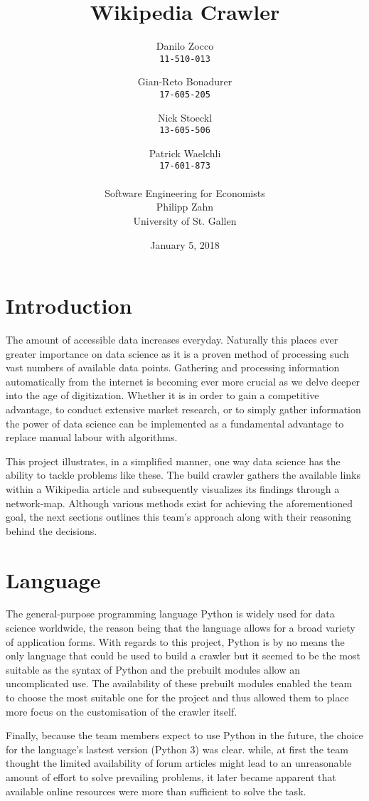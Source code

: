 \documentclass[10pt]{article}
\title{Wikipedia Crawler}
\author{Danilo Zocco\\ \texttt{11-510-013}
	\and Gian-Reto Bonadurer\\ \texttt{17-605-205}
	\and Nick Stoeckl\\ \texttt{13-605-506}
	\and Patrick Waelchli\\ \texttt{17-601-873}\\ \\
	\large Software Engineering for Economists\\
	\large Philipp Zahn\\
	\large University of St. Gallen}
\date{January 5, 2018}
\begin{document}
\maketitle
\newpage

\tableofcontents
\newpage


\section{Introduction}

The amount of accessible data increases everyday. Naturally this places ever greater importance on data science as it is a proven method of processing such vast numbers of available data points. \cite{dat} Gathering and processing information automatically from 
the internet is becoming ever more crucial as we delve deeper into the age of digitization. Whether it is in order to gain a competitive advantage, to conduct extensive market research, or to simply gather information the power of data science can be implemented as a fundamental advantage to replace manual labour with algorithms. \par \noindent
This project illustrates, in a simplified manner, one way data science has the ability to tackle problems like these. The build crawler gathers the available links within a Wikipedia article and subsequently visualizes its findings through a network-map. Although various methods exist for achieving the aforementioned goal, the next sections outlines this team's approach along with their reasoning behind the decisions.

\section{Language}

The general-purpose programming language Python is widely used for data science worldwide, the reason being that the language allows for a broad variety of application forms. \cite{pyt} With regards to this project, Python is by no means the only language that could be used to build a crawler but it seemed to be the most suitable as the syntax of Python and the prebuilt modules allow an uncomplicated use. The availability of these prebuilt modules enabled the team to choose the most suitable one for the project and thus allowed them to place more focus on the customisation of the crawler itself. \par \noindent 
Finally, because the team members expect to use Python in the future, the choice for the language's lastest version (Python 3) was clear. while, at first the team thought the limited availability of forum articles might lead to an unreasonable amount of effort to solve prevailing problems, it later became apparent that available online resources were more than sufficient to solve the task. 
\end{document}
